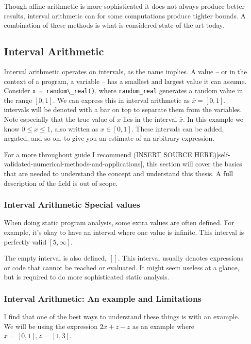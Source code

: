 \documentclass[msc,lith,english]{liuthesis}
\begin{document}
Though affine arithmetic is more sophisticated it does not always produce better results, interval arithmetic can for some computations produce tighter bounds. A combination of these methods is what is considered state of the art today.

\subsection{Interval Arithmetic}
Interval arithmetic operates on intervals, as the name implies. A value -- or in the context of a program, a variable -- has a smallest and largest value it can assume. Consider \verb`x = random\_real()`, where \verb`random_real` generates a random value in the range $[0, 1]$. We can express this in interval arithmetic as $\bar{x} = [0, 1]$, intervals will be denoted with a bar on top to separate them from the variables. Note especially that the true value of $x$ lies in the interval $\bar{x}$. In this example we know $0 \leq x \leq 1$, also written as $x \in [0, 1]$. These intervals can be added, negated, and so on, to give you an estimate of an arbitrary expression.

For a more throughout guide I recommend (INSERT SOURCE HERE)[self-validated-numerical-methods-and-applications], this section will cover the basics that are needed to understand the concept and understand this thesis. A full description of the field is out of scope.

\subsubsection{Interval Arithmetic Special values}
When doing static program analysis, some extra values are often defined. For example, it's okay to have an interval where one value is infinite. This interval is perfectly valid $[5, \infty]$.

The empty interval is also defined, $[]$. This interval usually denotes expressions or code that cannot be reached or evaluated. It might seem useless at a glance, but is required to do more sophisticated static analysis.

\subsubsection{Interval Arithmetic: An example and Limitations}
I find that one of the best ways to understand these things is with an example.
We will be using the expression $2x + z - z$ as an example where $x = [0, 1], z = [1, 3]$.
\end{document}
